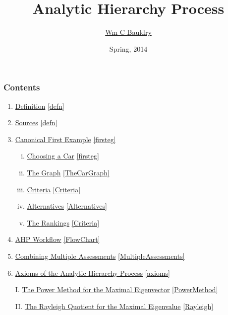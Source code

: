 \documentclass[10pt,handout,hyperref={colorlinks=true,linkcolor=blue,citecolor=citelink,urlcolor=gray}]{beamer}
\title{Analytic Hierarchy Process}
\author{\href{http://www.mathsci.appstate.edu/~wmcb/}{Wm C Bauldry}}
\institute{MAT 4340/5340}
\date{Spring, 2014}
\newcounter{e_temp}
\newcommand{\CL}[2]{\hyperlink{#1}{#2} \dotfill \ref{#1}} %
\begin{document}
\graphicspath{{Images/}}
\logo{}
\begin{frame}
	\titlepage
\end{frame}

\begin{frame}
\frametitle{Contents}
\begin{enumerate}
\setlength{\itemsep}{1ex}
\item \CL{defn}{Definition}
\item \CL{defn}{Sources}
\item \CL{firsteg}{Canonical First Example} \\[-0.5ex]
	\begin{enumerate}[i.]
	\item \CL{firsteg}{Choosing a Car}
	\item \CL{TheCarGraph}{The Graph}
	\item \CL{Criteria}{Criteria}
	\item \CL{Alternatives}{Alternatives}
	\item \CL{Criteria}{The Rankings}
	\end{enumerate}
\item \CL{FlowChart}{AHP Workflow}
\item \CL{MultipleAssessments}{Combining Multiple Assessments}
\item \CL{axioms}{Axioms of the Analytic Hierarchy Process}
\end{enumerate}
\vspace{3ex}

\begin{itemize}
\item[I.] \CL{PowerMethod}{The Power Method for the Maximal Eigenvector}
\item[II.] \CL{Rayleigh}{The Rayleigh Quotient for the Maximal Eigenvalue}
\end{itemize}

\end{frame}

\addtocounter{framenumber}{-2}
\end{document}

